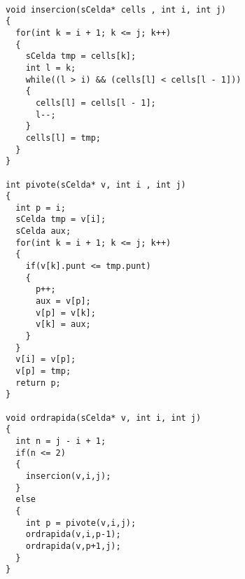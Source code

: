 \begin{lstlisting}

void insercion(sCelda* cells , int i, int j)
{
  for(int k = i + 1; k <= j; k++)
  {
    sCelda tmp = cells[k];
    int l = k;
    while((l > i) && (cells[l] < cells[l - 1]))
    {
      cells[l] = cells[l - 1];
      l--;
    }
    cells[l] = tmp;
  }
}

int pivote(sCelda* v, int i , int j)
{
  int p = i;
  sCelda tmp = v[i];
  sCelda aux;
  for(int k = i + 1; k <= j; k++)
  {
    if(v[k].punt <= tmp.punt)
    {
      p++;
      aux = v[p];
      v[p] = v[k];
      v[k] = aux;
    }
  }
  v[i] = v[p];
  v[p] = tmp;
  return p;
}

void ordrapida(sCelda* v, int i, int j)
{
  int n = j - i + 1;
  if(n <= 2)
  {
    insercion(v,i,j);
  }
  else
  {
    int p = pivote(v,i,j);
    ordrapida(v,i,p-1);
    ordrapida(v,p+1,j);
  }
}

\end{lstlisting}
